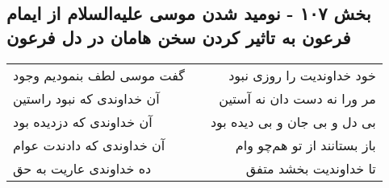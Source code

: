 \begin{center}
\section*{بخش ۱۰۷ - نومید شدن موسی علیه‌السلام از ایمام فرعون به تاثیر کردن  سخن هامان در دل فرعون}
\label{sec:sh107}
\begin{longtable}{l p{0.5cm} r}
گفت موسی لطف بنمودیم وجود
&&
خود خداوندیت را روزی نبود
\\
آن خداوندی که نبود راستین
&&
مر ورا نه دست دان نه آستین
\\
آن خداوندی که دزدیده بود
&&
بی دل و بی جان و بی دیده بود
\\
آن خداوندی که دادندت عوام
&&
باز بستانند از تو هم‌چو وام
\\
ده خداوندی عاریت به حق
&&
تا خداوندیت بخشد متفق
\\
\end{longtable}
\end{center}
